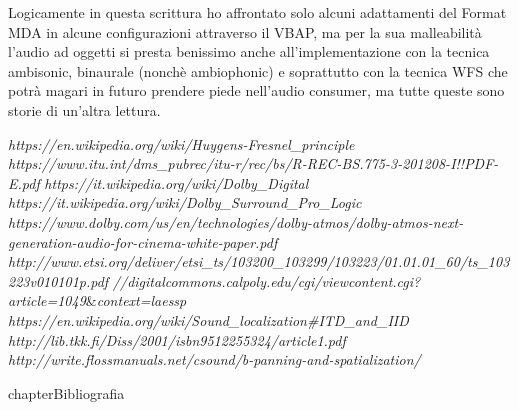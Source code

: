 \documentclass[12pt,a4paper]{report}
\begin{document}
Logicamente in questa scrittura ho affrontato solo alcuni adattamenti del Format MDA in alcune configurazioni attraverso il VBAP, ma per la sua malleabilità l'audio ad oggetti si presta benissimo anche all'implementazione con la tecnica ambisonic, binaurale (nonchè ambiophonic) e soprattutto con la tecnica WFS che potrà magari in futuro prendere piede nell'audio consumer, ma tutte queste sono storie di un'altra lettura.




\begin{thebibliography}{}

 \textit{https://en.wikipedia.org/wiki/Huygens-Fresnel\_principle}
 \textit{https://www.itu.int/dms\_pubrec/itu-r/rec/bs/R-REC-BS.775-3-201208-I!!PDF-E.pdf}
 \textit{https://it.wikipedia.org/wiki/Dolby\_Digital}
 \textit{https://it.wikipedia.org/wiki/Dolby\_Surround\_Pro\_Logic}
 \textit{https://www.dolby.com/us/en/technologies/dolby-atmos/dolby-atmos-next-generation-audio-for-cinema-white-paper.pdf}
\textit{http://www.etsi.org/deliver/etsi\_ts/103200\_103299/103223/01.01.01\_60/ts\_103223v010101p.pdf}
\textit{//digitalcommons.calpoly.edu/cgi/viewcontent.cgi?article=1049}\&\textit{context=laessp}
 \textit{https://en.wikipedia.org/wiki/Sound\_localization\#ITD\_and\_IID}
 \textit{http://lib.tkk.fi/Diss/2001/isbn9512255324/article1.pdf}
 \textit{http://write.flossmanuals.net/csound/b-panning-and-spatialization/}
\end{thebibliography}
 {chapter}{Bibliografia}
\end{document}
